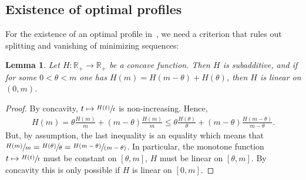 \documentclass[10pt]{amsart}
\newcommand{\spfrac}[2]{{\sfrac{#1}{(#2)}}}
\theoremstyle{plain}
\newtheorem{lemma}[theorem]{Lemma}
\theoremstyle{definition}
\newcommand{\R}{\mathbb{R}}
\begin{document}
\subsection{Existence of optimal profiles}
For the existence of an optimal profile in~, we need a criterion that rules out splitting and vanishing of minimizing sequences:
\begin{lemma}\label{IndecomposableLinear}
Let \(H:\R_+\to\R_+\) be a concave function. Then $H$ is subadditive, and if for some \(0 < \theta < m\) one has \(H(m)=H(m-\theta)+H(\theta)\), then \(H\) is linear on \((0,m)\).
\end{lemma}
\begin{proof} By concavity, \(t\mapsto \sfrac{H(t)}{t}\) is non-increasing. Hence,
\begin{align*}
H(m)=\theta\frac{H(m)}{m}+(m-\theta)\frac{H(m)}{m}\leq \theta\frac{H(\theta)}{\theta}+(m-\theta)\frac{H(m-\theta)}{m-\theta}.
\end{align*}
But, by assumption, the last inequality is an equality which means that \(\sfrac{H(m)}{m}=\sfrac{H(\theta)}{\theta}=\spfrac{H(m-\theta)}{m-\theta}\). In particular, the monotone function \(t\mapsto \sfrac{H(t)}{t}\) must be constant on \([\theta,m]\), \ie \(H\) must be linear on \([\theta,m]\). By concavity this is only possible if \(H\) is linear on \([0,m]\).
\end{proof}
\end{document}
